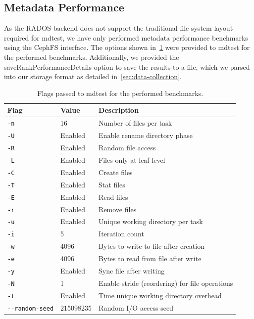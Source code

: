 \pagebreak
\subsection{Metadata Performance}

As the \ac{RADOS} backend does not support the traditional file system layout required for mdtest, we have only performed metadata performance benchmarks using the \ac{CephFS} interface. The options shown in~\cref{tbl:mdtest-configured-options} were provided to mdtest for the performed benchmarks. Additionally, we provided the saveRankPerformanceDetails option to save the results to a file, which we parsed into our storage format as detailed in~\cref{sec:data-collection}.

\begin{table}[htbp]
\centering
\begin{tabular}{|lll|}
\hline
Flag               & Value & Description \\
\hline
\texttt{-n} & 16 & Number of files per task \\
\texttt{-U} & Enabled & Enable rename directory phase \\
\texttt{-R} & Enabled & Random file access \\
\texttt{-L} & Enabled & Files only at leaf level \\
\texttt{-C} & Enabled & Create files \\
\texttt{-T} & Enabled & Stat files \\
\texttt{-E} & Enabled & Read files \\
\texttt{-r} & Enabled & Remove files \\
\texttt{-u} & Enabled & Unique working directory per task \\
\texttt{-i} & 5 & Iteration count \\
\texttt{-w} & 4096 & Bytes to write to file after creation \\
\texttt{-e} & 4096 & Bytes to read from file after write \\
\texttt{-y} & Enabled & Sync file after writing \\
\texttt{-N} & 1 & Enable stride (reordering) for file operations \\
\texttt{-t} & Enabled & Time unique working directory overhead \\
\texttt{-{}-random-seed} & 215098235 & Random \ac{I/O} access seed \\
\hline
\end{tabular}
\caption[Configured mdtest Options]{Flags passed to mdtest for the performed benchmarks.}
\label{tbl:mdtest-configured-options}
\end{table}

